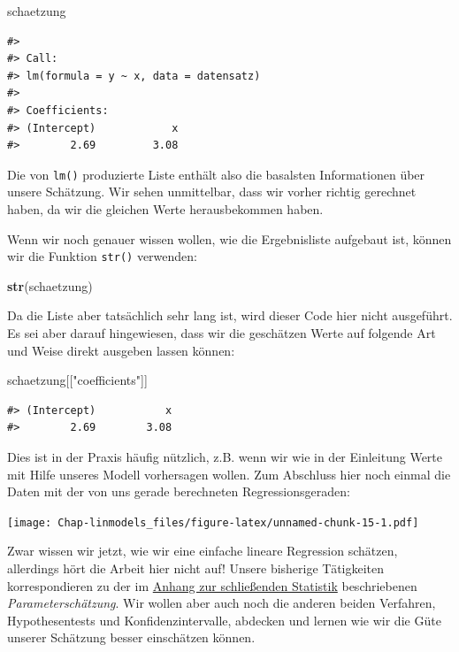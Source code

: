 \documentclass[]{book}
\newenvironment{Shaded}{\begin{snugshade}}{\end{snugshade}}
\newcommand{\KeywordTok}[1]{\textcolor[rgb]{0.13,0.29,0.53}{\textbf{#1}}}
\newcommand{\StringTok}[1]{\textcolor[rgb]{0.31,0.60,0.02}{#1}}
\newcommand{\NormalTok}[1]{#1}
\begin{document}
\begin{Shaded}
\begin{Highlighting}[]
\NormalTok{schaetzung}
\end{Highlighting}
\end{Shaded}

\begin{verbatim}
#> 
#> Call:
#> lm(formula = y ~ x, data = datensatz)
#> 
#> Coefficients:
#> (Intercept)            x  
#>        2.69         3.08
\end{verbatim}

Die von \texttt{lm()} produzierte Liste enthält also die basalsten
Informationen über unsere Schätzung. Wir sehen unmittelbar, dass wir
vorher richtig gerechnet haben, da wir die gleichen Werte herausbekommen
haben.

Wenn wir noch genauer wissen wollen, wie die Ergebnisliste aufgebaut
ist, können wir die Funktion \texttt{str()} verwenden:

\begin{Shaded}
\begin{Highlighting}[]
\KeywordTok{str}\NormalTok{(schaetzung)}
\end{Highlighting}
\end{Shaded}

Da die Liste aber tatsächlich sehr lang ist, wird dieser Code hier nicht
ausgeführt. Es sei aber darauf hingewiesen, dass wir die geschätzen
Werte auf folgende Art und Weise direkt ausgeben lassen können:

\begin{Shaded}
\begin{Highlighting}[]
\NormalTok{schaetzung[[}\StringTok{"coefficients"}\NormalTok{]]}
\end{Highlighting}
\end{Shaded}

\begin{verbatim}
#> (Intercept)           x 
#>        2.69        3.08
\end{verbatim}

Dies ist in der Praxis häufig nützlich, z.B. wenn wir wie in der
Einleitung Werte mit Hilfe unseres Modell vorhersagen wollen. Zum
Abschluss hier noch einmal die Daten mit der von uns gerade berechneten
Regressionsgeraden:

\texttt{[image: Chap-linmodels\_files/figure-latex/unnamed-chunk-15-1.pdf]}

Zwar wissen wir jetzt, wie wir eine einfache lineare Regression
schätzen, allerdings hört die Arbeit hier nicht auf! Unsere bisherige
Tätigkeiten korrespondieren zu der im
\protect\hyperlink{stat-rep}{Anhang zur schließenden Statistik}
beschriebenen \emph{Parameterschätzung}. Wir wollen aber auch noch die
anderen beiden Verfahren, Hypothesentests und Konfidenzintervalle,
abdecken und lernen wie wir die Güte unserer Schätzung besser
einschätzen können.
\end{document}
